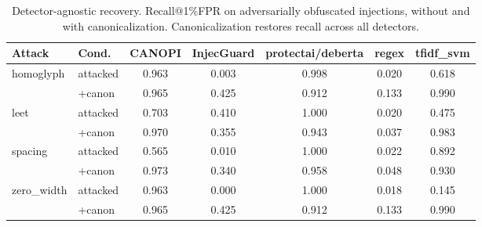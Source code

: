 \begin{table}[ht]\centering
\caption{Detector-agnostic recovery. Recall@1\%FPR on adversarially obfuscated injections, without and with canonicalization. Canonicalization restores recall across all detectors.}
\label{tab:recovery}
\small
\begin{tabular}{llccccc}
\toprule
Attack & Cond. & CANOPI & InjecGuard & protectai/deberta & regex & tfidf_svm \\
\midrule
homoglyph & attacked & 0.963 & 0.003 & 0.998 & 0.020 & 0.618 \\
 & +canon & 0.965 & 0.425 & 0.912 & 0.133 & 0.990 \\
\midrule
leet & attacked & 0.703 & 0.410 & 1.000 & 0.020 & 0.475 \\
 & +canon & 0.970 & 0.355 & 0.943 & 0.037 & 0.983 \\
\midrule
spacing & attacked & 0.565 & 0.010 & 1.000 & 0.022 & 0.892 \\
 & +canon & 0.973 & 0.340 & 0.958 & 0.048 & 0.930 \\
\midrule
zero_width & attacked & 0.963 & 0.000 & 1.000 & 0.018 & 0.145 \\
 & +canon & 0.965 & 0.425 & 0.912 & 0.133 & 0.990 \\
\midrule
\bottomrule
\end{tabular}
\end{table}